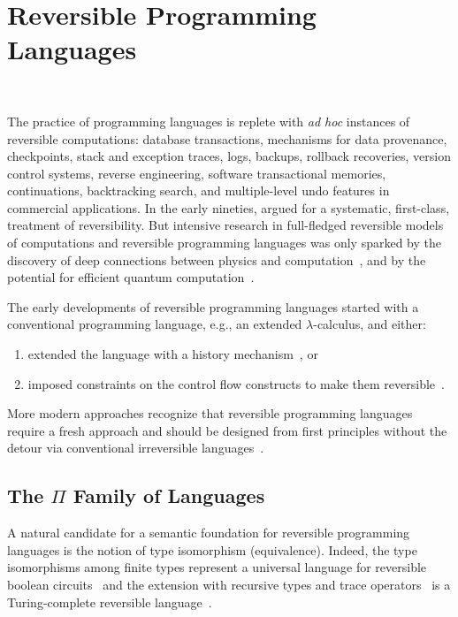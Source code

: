 \section{Reversible Programming Languages}~\label{sec:reversible}

The practice of programming languages is replete with \emph{ad hoc} instances of reversible computations: database
transactions, mechanisms for data provenance, checkpoints, stack and exception traces, logs, backups, rollback
recoveries, version control systems, reverse engineering, software transactional memories, continuations, backtracking
search, and multiple-level undo features in commercial applications. In the early nineties,
\citet{Baker:1992:LLL,Baker:1992:NFT} argued for a systematic, first-class, treatment of reversibility. But intensive
research in full-fledged reversible models of computations and reversible programming languages was only sparked by the
discovery of deep connections between physics and
computation~\cite{Landauer:1961,PhysRevA.32.3266,Toffoli:1980,bennett1985fundamental,Frank:1999:REC:930275, Hey:1999:FCE:304763,fredkin1982conservative}, and by the
potential for efficient quantum computation~\cite{springerlink:10.1007/BF02650179}.

The early developments of reversible programming languages started
with a conventional programming language, e.g., an extended
$\lambda$-calculus, and either:
\begin{enumerate}
\item extended the language with a history
mechanism~\cite{vanTonder:2004,Kluge:1999:SEMCD,lorenz,danos2004reversible}, or
\item imposed constraints on the control flow constructs to make them
reversible~\cite{Yokoyama:2007:RPL:1244381.1244404}.
\end{enumerate}
More modern approaches recognize that reversible programming languages require a fresh approach and should be designed
from first principles without the detour via conventional irreversible
languages~\cite{Yokoyama:2008:PRP,Mu:2004:ILRC,abramsky2005structural,DiPierro:2006:RCL:1166042.1166047,
  rc2011,James:2012:IE:2103656.2103667,Carette2016}.

\subsection{The $\Pi$ Family of Languages}

A natural candidate for a semantic foundation for reversible programming languages is the notion of type isomorphism
(equivalence). Indeed, the type isomorphisms among finite types represent a universal language for reversible boolean
circuits~\cite{James:2012:IE:2103656.2103667} and the extension with recursive types and trace
operators~\cite{Hasegawa:1997:RCS:645893.671607} is a Turing-complete reversible
language~\cite{James:2012:IE:2103656.2103667,rc2011}.

